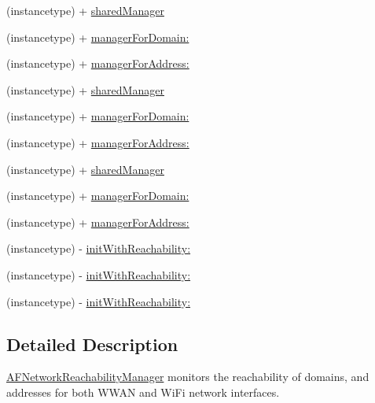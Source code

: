  \begin{DoxyCompactItemize}
\item 
(instancetype) + \mbox{\hyperlink{interface_a_f_network_reachability_manager_abc98fb713ecc5de942904768512ea1d0}{shared\+Manager}}
\item 
(instancetype) + \mbox{\hyperlink{interface_a_f_network_reachability_manager_a6bb357339197c29a2305519e7e4622f3}{manager\+For\+Domain\+:}}
\item 
(instancetype) + \mbox{\hyperlink{interface_a_f_network_reachability_manager_abcf59bed68830fd7440310b3772022f4}{manager\+For\+Address\+:}}
\item 
(instancetype) + \mbox{\hyperlink{interface_a_f_network_reachability_manager_abc98fb713ecc5de942904768512ea1d0}{shared\+Manager}}
\item 
(instancetype) + \mbox{\hyperlink{interface_a_f_network_reachability_manager_a6bb357339197c29a2305519e7e4622f3}{manager\+For\+Domain\+:}}
\item 
(instancetype) + \mbox{\hyperlink{interface_a_f_network_reachability_manager_abcf59bed68830fd7440310b3772022f4}{manager\+For\+Address\+:}}
\item 
(instancetype) + \mbox{\hyperlink{interface_a_f_network_reachability_manager_abc98fb713ecc5de942904768512ea1d0}{shared\+Manager}}
\item 
(instancetype) + \mbox{\hyperlink{interface_a_f_network_reachability_manager_a6bb357339197c29a2305519e7e4622f3}{manager\+For\+Domain\+:}}
\item 
(instancetype) + \mbox{\hyperlink{interface_a_f_network_reachability_manager_abcf59bed68830fd7440310b3772022f4}{manager\+For\+Address\+:}}
\item 
(instancetype) -\/ \mbox{\hyperlink{interface_a_f_network_reachability_manager_a14b6db66e80c81c86cb698e98f991392}{init\+With\+Reachability\+:}}
\item 
(instancetype) -\/ \mbox{\hyperlink{interface_a_f_network_reachability_manager_a14b6db66e80c81c86cb698e98f991392}{init\+With\+Reachability\+:}}
\item 
(instancetype) -\/ \mbox{\hyperlink{interface_a_f_network_reachability_manager_a14b6db66e80c81c86cb698e98f991392}{init\+With\+Reachability\+:}}
\end{DoxyCompactItemize}


\subsection{Detailed Description}
{\ttfamily \mbox{\hyperlink{interface_a_f_network_reachability_manager}{A\+F\+Network\+Reachability\+Manager}}} monitors the reachability of domains, and addresses for both W\+W\+AN and Wi\+Fi network interfaces.


